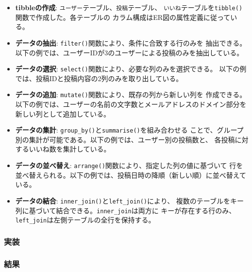\documentclass[12pt,a4paper]{ltjsarticle}
\begin{document}
\begin{itemize}[nosep]
    \item \textbf{tibbleの作成}: \texttt{ユーザー}テーブル、\texttt{投稿}テーブル、
          \texttt{いいね}テーブルを\texttt{tibble()}関数で作成した。各テーブルの
          カラム構成はER図の属性定義に従っている。
    \item \textbf{データの抽出}: \texttt{filter()}関数により、条件に合致する行のみを
          抽出できる。以下の例では、ユーザーIDが3のユーザーによる投稿のみを抽出している。
    \item \textbf{データの選択}: \texttt{select()}関数により、必要な列のみを選択できる。
          以下の例では、投稿IDと投稿内容の2列のみを取り出している。
    \item \textbf{データの追加}: \texttt{mutate()}関数により、既存の列から新しい列を
          作成できる。以下の例では、ユーザーの名前の文字数とメールアドレスのドメイン部分を
          新しい列として追加している。
    \item \textbf{データの集計}: \texttt{group\_by()}と\texttt{summarise()}を組み合わせる
          ことで、グループ別の集計が可能である。以下の例では、ユーザー別の投稿数と、
          各投稿に対するいいね数を集計している。
    \item \textbf{データの並べ替え}: \texttt{arrange()}関数により、指定した列の値に基づいて
          行を並べ替えられる。以下の例では、投稿日時の降順（新しい順）に並べ替えている。
    \item \textbf{データの結合}: \texttt{inner\_join()}と\texttt{left\_join()}により、
          複数のテーブルをキー列に基づいて結合できる。\texttt{inner\_join}は両方に
          キーが存在する行のみ、\texttt{left\_join}は左側テーブルの全行を保持する。
\end{itemize}

\subsubsection{実装}


\subsubsection{結果}

\end{document}
